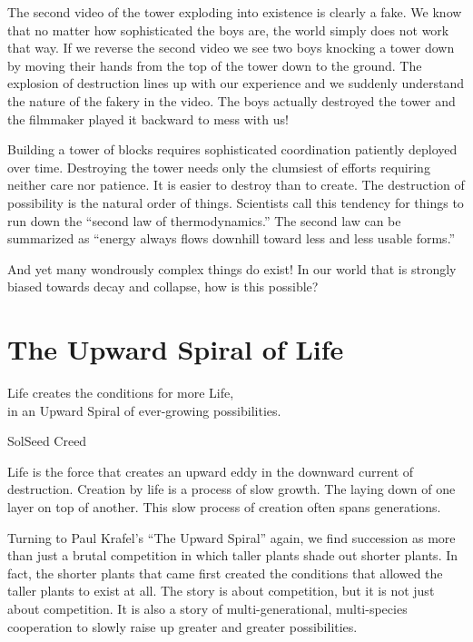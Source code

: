 \documentclass[ebook,12pt,openany,twoside]{memoir}
\newcommand{\tab}{\hspace*{2em}}
\newcommand{\imagefacingchapter}[1]{
  \cleartoverso
  \clearpage \null
  \thispagestyle{cleared}
  \AddToShipoutPictureBG*{%
    \AtStockLowerLeft{%
      \texttt{[image: \#1]}
    }
  }
  \clearpage
}
\begin{document}
The second video of the tower exploding into existence is clearly a fake. We
know that no matter how sophisticated the boys are, the world simply does not
work that way. If we reverse the second video we see two boys knocking a tower
down by moving their hands from the top of the tower down to the ground. The
explosion of destruction lines up with our experience and we suddenly
understand the nature of the fakery in the video. The boys actually destroyed
the tower and the filmmaker played it backward to mess with us!

Building a tower of blocks requires sophisticated coordination patiently
deployed over time. Destroying the tower needs only the clumsiest of efforts
requiring neither care nor patience. It is easier to destroy than to create.
The destruction of possibility is the natural order of things. Scientists call
this tendency for things to run down the ``second law of thermodynamics.'' The
second law can be summarized as ``energy always flows downhill toward less and
less usable forms.''

And yet many wondrously complex things do exist! In our world that is strongly
biased towards decay and collapse, how is this possible?

\imagefacingchapter{images/UpwardSpiral}
\chapter{The Upward Spiral of Life}

\setlength\epigraphwidth{3.6in}
\epigraph{
  Life creates the conditions for more Life,\\
  \tab in an Upward Spiral of ever-growing possibilities.\\
}{SolSeed Creed}

\noindent Life is the force that creates an upward eddy in the downward current of
destruction. Creation by life is a process of slow growth. The laying down of
one layer on top of another. This slow process of creation often spans
generations.

Turning to Paul Krafel's ``The Upward Spiral'' again, we find succession as
more than just a brutal competition in which taller plants shade out shorter
plants. In fact, the shorter plants that came first created the conditions that
allowed the taller plants to exist at all. The story is about competition, but
it is not just about competition. It is also a story of multi-generational,
multi-species cooperation to slowly raise up greater and greater possibilities.
\end{document}
